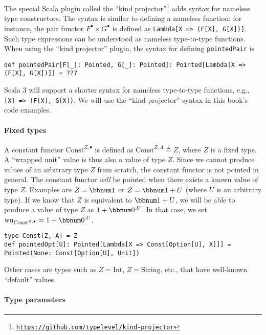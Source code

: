 The special Scala plugin called the \textsf{``}kind
projector\textsf{''}\footnote{\texttt{\href{https://github.com/typelevel/kind-projector}{https://github.com/typelevel/kind-projector}}}
adds syntax for nameless type constructors. The syntax is similar
to defining a nameless function: for instance, the pair functor $F^{\bullet}\times G^{\bullet}$
is defined as \lstinline!Lambda[X => (F[X], G[X])]!. Such type expressions
can be understood as nameless
type-to-type functions. When using the \textsf{``}kind projector\textsf{''} plugin,
the syntax for defining \lstinline!pointedPair! is
\begin{lstlisting}
def pointedPair[F[_]: Pointed, G[_]: Pointed]: Pointed[Lambda[X => (F[X], G[X])]] = ???
\end{lstlisting}
Scala 3 will support a shorter syntax for nameless type-to-type functions,
e.g., \lstinline![X] => (F[X], G[X])!. We will use the \textsf{``}kind projector\textsf{''}
syntax in this book\textsf{'}s code examples.

\paragraph{Fixed types}

A constant functor $\text{Const}^{Z,\bullet}$ is defined as $\text{Const}^{Z,A}\triangleq Z$,
where $Z$ is a fixed type. A \textsf{``}wrapped unit\textsf{''} value is thus also
a value of type $Z$. Since we cannot produce values of an arbitrary
type $Z$ from scratch, the constant functor is not pointed in general.
The constant functor \emph{will} be pointed when there exists a known
value of type $Z$. Examples are $Z=\bbnum 1$ or $Z=\bbnum 1+U$
(where $U$ is an arbitrary type). If we know that $Z$ is equivalent
to $\bbnum 1+U$, we will be able to produce a value of type $Z$
as $1+\bbnum 0^{:U}$. In that case, we set $\text{wu}_{\text{Const}^{Z,\bullet}}=1+\bbnum 0^{:U}$.
\begin{lstlisting}
type Const[Z, A] = Z
def pointedOpt[U]: Pointed[Lambda[X => Const[Option[U], X]]] = Pointed(None: Const[Option[U], Unit])
\end{lstlisting}
Other cases are types such as $Z=\text{Int}$, $Z=\text{String}$,
etc., that have well-known \textsf{``}default\textsf{''} values.

\paragraph{Type parameters}

